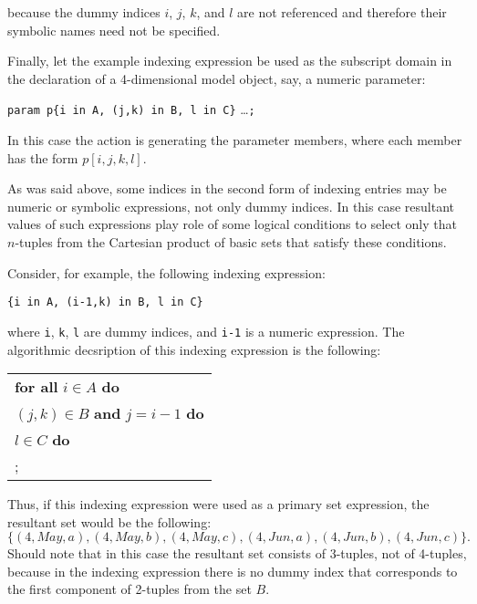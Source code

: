 \documentclass[10pt]{article}
\begin{document}
\noindent because the dummy indices $i$, $j$, $k$, and $l$ are not
referenced and therefore their symbolic names need not be specified.

Finally, let the example indexing expression be used as the subscript
domain in the declaration of a 4-dimensional model object, say,
a numeric parameter:

\medskip

\noindent\hfil
{\tt param p\{i in A, (j,k) in B, l in C\}} \dots {\tt;}

\medskip

\noindent In this case the action is generating the parameter members,
where each member has the form $p[i,j,k,l]$.

As was said above, some indices in the second form of indexing entries
may be numeric or symbolic expressions, not only dummy indices. In this
case resultant values of such expressions play role of some logical
conditions to select only that $n$-tuples from the Cartesian product of
basic sets that satisfy these conditions.

Consider, for example, the following indexing expression:

\medskip

\noindent\hfil
{\tt\{i in A, (i-1,k) in B, l in C\}}

\medskip

\noindent where {\tt i}, {\tt k}, {\tt l} are dummy indices, and
{\tt i-1} is a numeric expression. The algorithmic decsription of this
indexing expression is the following:

\medskip

\noindent\hfil
\begin{tabular}{@{}l@{}}
{\bf for all} $i\in A$ {\bf do}\\
\hspace{12pt}{\bf for all} $(j,k)\in B$ {\bf and} $j=i-1$ {\bf do}\\
\hspace{24pt}{\bf for all} $l\in C$ {\bf do}\\
\hspace{36pt}{\it action};\\
\end{tabular}

\medskip

\noindent Thus, if this indexing expression were used as a primary set
expression, the resultant set would be the following:
$$\{(4,May,a),(4,May,b),(4,May,c),(4,Jun,a),(4,Jun,b),(4,Jun,c)\}.$$
Should note that in this case the resultant set consists of 3-tuples,
not of 4-tuples, because in the indexing expression there is no dummy
index that corresponds to the first component of 2-tuples from the set
$B$.
\end{document}
